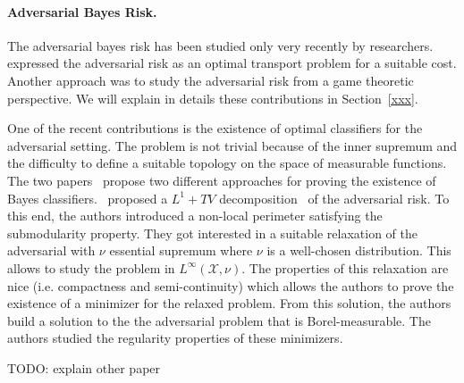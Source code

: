 \paragraph{Adversarial Bayes Risk.} The adversarial bayes risk has been studied only very recently by researchers.~\cite{xxx} expressed the adversarial risk as an optimal transport problem for a suitable cost. Another approach was to study the adversarial risk from a game theoretic perspective. We will explain in details these contributions in Section~\ref{xxx}. 


One of the recent contributions is the existence of  optimal classifiers for the adversarial setting.  The problem is not trivial because of the inner supremum and the difficulty to define a suitable topology on the space of measurable functions. The two papers~\citep{awasthi2021existence,bungert2021geometry} propose two different approaches for proving the existence of Bayes classifiers.~\cite{bungert2021geometry} proposed a $L^1+TV$ decomposition~\citep{chan2005aspects} of the adversarial risk.  To this end, the authors introduced a non-local perimeter satisfying the submodularity property. They got interested in a suitable relaxation of the adversarial with $\nu$ essential supremum where $\nu$ is a well-chosen distribution. This allows to study the problem in $L^\infty(\mathcal{X},\nu)$. The properties of this relaxation are nice (i.e. compactness and semi-continuity) which allows the authors to prove the existence of a minimizer for the relaxed problem. From this solution, the authors build a solution to the the adversarial problem that is Borel-measurable. The authors studied the regularity properties of these minimizers.

TODO: explain other paper
 